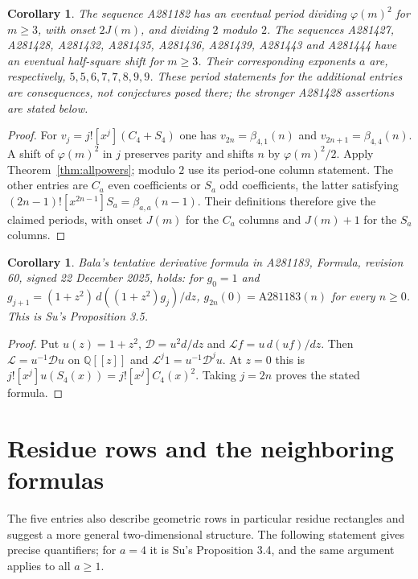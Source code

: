 \documentclass[11pt]{article}
\newtheorem{corollary}[theorem]{Corollary}
\newcommand{\Q}{\mathbb Q}
\newcommand{\ph}{\varphi}
\begin{document}
\begin{corollary}\label{cor:neighborperiods}
The sequence A281182 has an eventual period dividing $\ph(m)^2$
for $m\ge3$, with onset $2J(m)$, and dividing $2$ modulo $2$.
The sequences A281427, A281428, A281432, A281435, A281436,
A281439, A281443 and A281444 have an eventual half-square shift
for $m\ge3$. Their corresponding exponents $a$ are, respectively,
$5,5,6,7,7,8,9,9$. These period statements for the additional
entries are consequences, not conjectures posed there;
the stronger A281428 assertions are stated below.
\end{corollary}
\begin{proof}
For $v_j=j![x^j](C_4+S_4)$ one has
$v_{2n}=\beta_{4,1}(n)$ and $v_{2n+1}=\beta_{4,4}(n)$.
A shift of $\ph(m)^2$ in $j$ preserves parity and shifts $n$ by
$\ph(m)^2/2$. Apply Theorem~\ref{thm:allpowers}; modulo $2$ use
its period-one column statement. The other entries are $C_a$
even coefficients or $S_a$ odd coefficients, the latter satisfying
$(2n-1)![x^{2n-1}]S_a=\beta_{a,a}(n-1)$.
Their definitions \cite{oeisneighbors} therefore give the claimed periods,
with onset $J(m)$ for the $C_a$ columns and $J(m)+1$ for the $S_a$ columns.
\end{proof}

\begin{corollary}\label{cor:derivative}
Bala's tentative derivative formula in A281183, Formula, revision 60,
signed 22 December 2025, holds: for $g_0=1$ and
$g_{j+1}=(1+z^2)\,d((1+z^2)g_j)/dz$,
$g_{2n}(0)=\mathrm{A281183}(n)$ for every $n\ge0$.
This is Su's Proposition 3.5.
\end{corollary}
\begin{proof}
Put $u(z)=1+z^2$, $\mathcal D=u^2d/dz$ and
$\mathcal Lf=u\,d(uf)/dz$. Then
$\mathcal L=u^{-1}\mathcal D u$ on $\Q[[z]]$ and
$\mathcal L^j1=u^{-1}\mathcal D^ju$.
At $z=0$ this is $j![x^j]u(S_4(x))=j![x^j]C_4(x)^2$.
Taking $j=2n$ proves the stated formula.
\end{proof}

\section{Residue rows and the neighboring formulas}
The five entries also describe geometric rows in particular residue
rectangles and suggest a more general two-dimensional structure.
The following statement gives precise quantifiers; for $a=4$ it is
Su's Proposition 3.4, and the same argument applies to all $a\ge1$.
\end{document}
